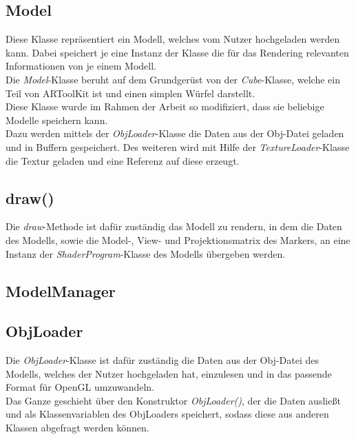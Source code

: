 \subsection{Model}
Diese Klasse repräsentiert ein Modell, welches vom Nutzer hochgeladen werden kann. Dabei speichert je eine Instanz der Klasse die für das Rendering relevanten Informationen von je einem Modell. \\
Die \textit{Model}-Klasse beruht auf dem Grundgerüst von der \textit{Cube}-Klasse, welche ein Teil von ARToolKit ist und einen simplen Würfel darstellt.\\
Diese Klasse wurde im Rahmen der Arbeit so modifiziert, dass sie beliebige Modelle speichern kann.\\
Dazu werden mittels der \textit{ObjLoader}-Klasse die Daten aus der Obj-Datei geladen und in Buffern gespeichert. Des weiteren wird mit Hilfe der \textit{TextureLoader}-Klasse die Textur geladen und eine Referenz auf diese erzeugt.\\

\subsection{draw()}
Die \textit{draw}-Methode ist dafür zuständig das Modell zu rendern, in dem die Daten des Modells, sowie die Model-, View- und Projektionsmatrix des Markers, an eine Instanz der \textit{ShaderProgram}-Klasse des Modells übergeben werden.

\subsection{ModelManager}

\subsection{ObjLoader}
Die \textit{ObjLoader}-Klasse ist dafür zuständig die Daten aus der Obj-Datei des Modells, welches der Nutzer hochgeladen hat, einzulesen und in das passende Format für OpenGL umzuwandeln.\\ 
Das Ganze geschieht über den Konstruktor \textit{ObjLoader()}, der die Daten ausließt und als Klassenvariablen des ObjLoaders speichert, sodass diese aus anderen Klassen abgefragt werden können.


